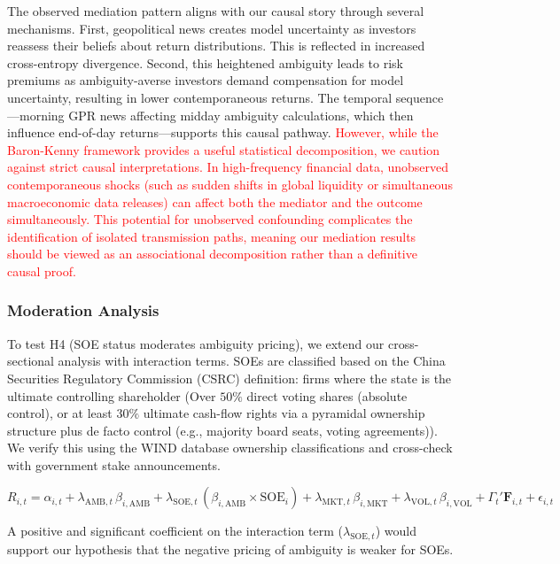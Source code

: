 \documentclass[preprint,12pt,authoryear]{elsarticle}
\begin{document}
The observed mediation pattern aligns with our causal story through several mechanisms. First, geopolitical news creates model uncertainty as investors reassess their beliefs about return distributions. This is reflected in increased cross-entropy divergence. Second, this heightened ambiguity leads to risk premiums as ambiguity-averse investors demand compensation for model uncertainty, resulting in lower contemporaneous returns. The temporal sequence---morning GPR news affecting midday ambiguity calculations, which then influence end-of-day returns---supports this causal pathway. \textcolor{red}{However, while the Baron-Kenny framework provides a useful statistical decomposition, we caution against strict causal interpretations. In high-frequency financial data, unobserved contemporaneous shocks (such as sudden shifts in global liquidity or simultaneous macroeconomic data releases) can affect both the mediator and the outcome simultaneously. This potential for unobserved confounding complicates the identification of isolated transmission paths, meaning our mediation results should be viewed as an associational decomposition rather than a definitive causal proof.}

\subsubsection{Moderation Analysis}

To test H4 (SOE status moderates ambiguity pricing), we extend our cross-sectional analysis with interaction terms. SOEs are classified based on the China Securities Regulatory Commission (CSRC) definition: firms where the state is the ultimate controlling shareholder (Over $50\%$ direct voting shares (absolute control), or at least $30\%$ ultimate cash-flow rights via a pyramidal ownership structure plus de facto control (e.g., majority board seats, voting agreements)). We verify this using the WIND database ownership classifications and cross-check with government stake announcements.

\begin{equation}
R_{i,t} = \alpha_{i,t} + \lambda_{\text{AMB},t} \, \beta_{i,\text{AMB}} + \lambda_{\text{SOE},t} \, (\beta_{i,\text{AMB}} \times \text{SOE}_i) + \lambda_{\text{MKT},t} \, \beta_{i,\text{MKT}} + \lambda_{\text{VOL},t} \, \beta_{i,\text{VOL}} + \Gamma_{t}' \mathbf{F}_{i,t} + \epsilon_{i,t}
\end{equation}

A positive and significant coefficient on the interaction term ($\lambda_{\text{SOE},t}$) would support our hypothesis that the negative pricing of ambiguity is weaker for SOEs.
\end{document}
